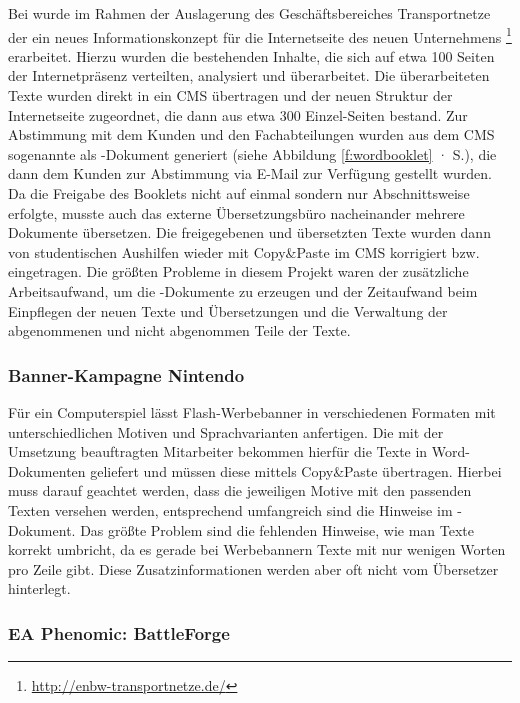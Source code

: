 Bei  wurde im Rahmen der Auslagerung des Geschäftsbereiches Transportnetze der  ein neues Informationskonzept für die Internetseite des neuen Unternehmens \footnote{\url{http://enbw-transportnetze.de/}} erarbeitet. Hierzu wurden die bestehenden Inhalte, die sich auf etwa 100 Seiten der Internetpräsenz verteilten, analysiert und überarbeitet. Die überarbeiteten Texte wurden direkt in ein CMS übertragen und der neuen Struktur der Internetseite zugeordnet, die dann aus etwa 300 Einzel-Seiten bestand. Zur Abstimmung mit dem Kunden und den Fachabteilungen wurden aus dem CMS sogenannte  als -Dokument generiert (siehe Abbildung \ref{f:wordbooklet} · S.\pageref{f:wordbooklet}), die dann dem Kunden zur Abstimmung via E-Mail zur Verfügung gestellt wurden. Da die Freigabe des Booklets nicht auf einmal sondern nur Abschnittsweise erfolgte, musste auch das externe Übersetzungsbüro nacheinander mehrere Dokumente übersetzen. Die freigegebenen und übersetzten Texte wurden dann von studentischen Aushilfen wieder mit Copy\&Paste im CMS korrigiert bzw. eingetragen. Die größten Probleme in diesem Projekt waren der zusätzliche Arbeitsaufwand, um die -Dokumente zu erzeugen und der Zeitaufwand beim Einpflegen der neuen Texte und Übersetzungen und die Verwaltung der abgenommenen und nicht abgenommen Teile der Texte.

\subsubsection{Banner-Kampagne Nintendo}

Für ein Computerspiel lässt  Flash-Werbebanner in verschiedenen Formaten mit unterschiedlichen Motiven und Sprachvarianten anfertigen. Die mit der Umsetzung beauftragten Mitarbeiter bekommen hierfür die Texte in Word-Dokumenten geliefert und müssen diese mittels Copy\&Paste übertragen. Hierbei muss darauf geachtet werden, dass die jeweiligen Motive mit den passenden Texten versehen werden, entsprechend umfangreich sind die Hinweise im -Dokument. Das größte Problem sind die fehlenden Hinweise, wie man Texte korrekt umbricht, da es gerade bei Werbebannern Texte mit nur wenigen Worten pro Zeile gibt. Diese Zusatzinformationen werden aber oft nicht vom Übersetzer hinterlegt.

\subsubsection{EA Phenomic: BattleForge}

